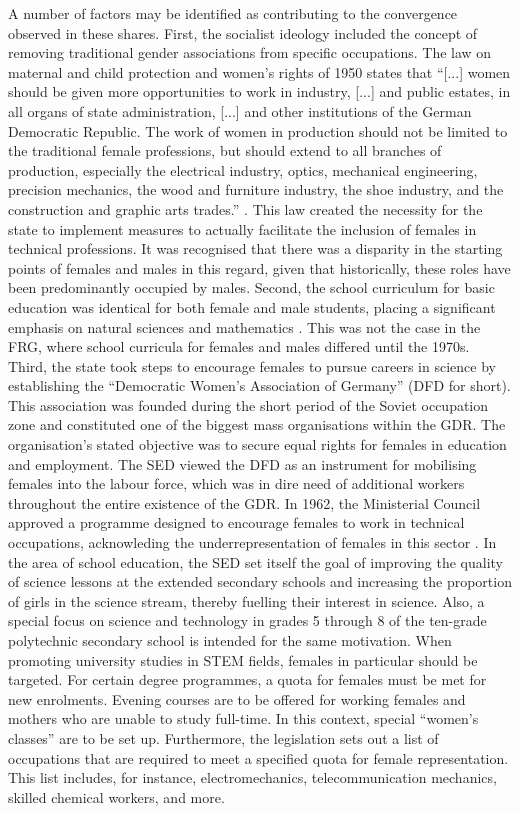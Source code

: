 \documentclass[a4paper, oneside, hyperfootnotes = false]{article}
\begin{document}
{%
A number of factors may be identified as contributing to the convergence observed in these shares.
First, the socialist ideology included the concept of removing traditional gender associations from specific occupations.
The law on maternal and child protection and women's rights of 1950 states that ``[...] women should be given more opportunities to work in industry, [...] and public estates, in all organs of state administration, [...] and other institutions of the German Democratic Republic.
The work of women in production should not be limited to the traditional female professions, but should extend to all branches of production, especially the electrical industry, optics, mechanical engineering, precision mechanics, the wood and furniture industry, the shoe industry, and the construction and graphic arts trades.'' \citep[§19.1]{GBl1950}.
This law created the necessity for the state to implement measures to actually facilitate the inclusion of females in technical professions.
It was recognised that there was a disparity in the starting points of females and males in this regard, given that historically, these roles have been predominantly occupied by males.
Second, the school curriculum for basic education was identical for both female and male students, placing a significant emphasis on natural sciences and mathematics \citep{FuchsSchuendeln2016, Campa2019, Davoli2021}.
This was not the case in the FRG, where school curricula for females and males differed until the 1970s.
Third, the state took steps to encourage females to pursue careers in science by establishing the ``Democratic Women's Association of Germany'' (DFD for short).
This association was founded during the short period of the Soviet occupation zone and constituted one of the biggest mass organisations within the GDR.
The organisation's stated objective was to secure equal rights for females in education and employment.
The SED viewed the DFD as an instrument for mobilising females into the labour force, which was in dire need of additional workers throughout the entire existence of the GDR.
In 1962, the Ministerial Council approved a programme designed to encourage females to work in technical occupations, acknowleding the underrepresentation of females in this sector \citep{GBl1962}.
In the area of school education, the SED set itself the goal of improving the quality of science lessons at the extended secondary schools and increasing the proportion of girls in the science stream, thereby fuelling their interest in science.
Also, a special focus on science and technology in grades 5 through 8 of the ten-grade polytechnic secondary school is intended for the same motivation.
When promoting university studies in STEM fields, females in particular should be targeted.
For certain degree programmes, a quota for females must be met for new enrolments.
Evening courses are to be offered for working females and mothers who are unable to study full-time.
In this context, special ``women's classes'' are to be set up.
Furthermore, the legislation sets out a list of occupations that are required to meet a specified quota for female representation.
This list includes, for instance, electromechanics, telecommunication mechanics, skilled chemical workers, and more.

}
\end{document}

